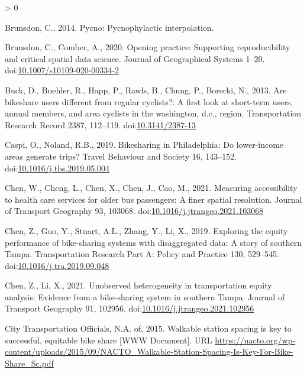 \documentclass[]{elsarticle} %
\newlength{\cslhangindent}
\newenvironment{CSLReferences}[2] %
 {%
  \setlength{\parindent}{0pt}
  \ifodd #1 \everypar{\setlength{\hangindent}{\cslhangindent}}\ignorespaces\fi
  \ifnum #2 > 0
  \setlength{\parskip}{#2\baselineskip}
  \fi
 }%
 {}
\begin{document}
\begin{CSLReferences}{1}{0}
\leavevmode\hypertarget{ref-R-pycno}{}%
Brunsdon, C., 2014. Pycno: Pycnophylactic interpolation.

\leavevmode\hypertarget{ref-brunsdon2020opening}{}%
Brunsdon, C., Comber, A., 2020. Opening practice: Supporting
reproducibility and critical spatial data science. Journal of
Geographical Systems 1--20.
doi:\href{https://doi.org/10.1007/s10109-020-00334-2}{10.1007/s10109-020-00334-2}

\leavevmode\hypertarget{ref-buckAreBikeshareUsers2013}{}%
Buck, D., Buehler, R., Happ, P., Rawls, B., Chung, P., Borecki, N.,
2013. Are bikeshare users different from regular cyclists?: A first look
at short-term users, annual members, and area cyclists in the
washington, d.c., region. Transportation Research Record 2387, 112--119.
doi:\href{https://doi.org/10.3141/2387-13}{10.3141/2387-13}

\leavevmode\hypertarget{ref-caspiBikesharingPhiladelphiaLowerincome2019}{}%
Caspi, O., Noland, R.B., 2019. Bikesharing in {Philadelphia}: {Do}
lower-income areas generate trips? Travel Behaviour and Society 16,
143--152.
doi:\href{https://doi.org/10.1016/j.tbs.2019.05.004}{10.1016/j.tbs.2019.05.004}

\leavevmode\hypertarget{ref-chenMeasuringAccessibilityHealth2021}{}%
Chen, W., Cheng, L., Chen, X., Chen, J., Cao, M., 2021. Measuring
accessibility to health care services for older bus passengers: {A}
finer spatial resolution. Journal of Transport Geography 93, 103068.
doi:\href{https://doi.org/10.1016/j.jtrangeo.2021.103068}{10.1016/j.jtrangeo.2021.103068}

\leavevmode\hypertarget{ref-chenExploringEquityPerformance2019}{}%
Chen, Z., Guo, Y., Stuart, A.L., Zhang, Y., Li, X., 2019. Exploring the
equity performance of bike-sharing systems with disaggregated data: {A}
story of southern {Tampa}. Transportation Research Part A: Policy and
Practice 130, 529--545.
doi:\href{https://doi.org/10.1016/j.tra.2019.09.048}{10.1016/j.tra.2019.09.048}

\leavevmode\hypertarget{ref-chenUnobservedHeterogeneityTransportation2021}{}%
Chen, Z., Li, X., 2021. Unobserved heterogeneity in transportation
equity analysis: {Evidence} from a bike-sharing system in southern
{Tampa}. Journal of Transport Geography 91, 102956.
doi:\href{https://doi.org/10.1016/j.jtrangeo.2021.102956}{10.1016/j.jtrangeo.2021.102956}

\leavevmode\hypertarget{ref-nactowalkingstation2015}{}%
City Transportation Officials, N.A. of, 2015. Walkable station spacing
is key to successful, equitable bike share {[}WWW Document{]}. URL
\url{https://nacto.org/wp-content/uploads/2015/09/NACTO_Walkable-Station-Spacing-Is-Key-For-Bike-Share_Sc.pdf}


\end{CSLReferences}
\end{document}
